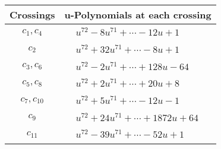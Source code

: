 \documentclass[1p]{elsarticle_modified}
\theoremstyle{definition}
\begin{document}
\begin{tabular}{m{50pt}|m{274pt}}
Crossings & \hspace{64pt}u-Polynomials at each crossing \\
\hline $$\begin{aligned}c_{1},c_{4}\end{aligned}$$&$\begin{aligned}
&u^{72}-8 u^{71}+\cdots-12 u+1
\end{aligned}$\\
\hline $$\begin{aligned}c_{2}\end{aligned}$$&$\begin{aligned}
&u^{72}+32 u^{71}+\cdots-8 u+1
\end{aligned}$\\
\hline $$\begin{aligned}c_{3},c_{6}\end{aligned}$$&$\begin{aligned}
&u^{72}-2 u^{71}+\cdots+128 u-64
\end{aligned}$\\
\hline $$\begin{aligned}c_{5},c_{8}\end{aligned}$$&$\begin{aligned}
&u^{72}+2 u^{71}+\cdots+20 u+8
\end{aligned}$\\
\hline $$\begin{aligned}c_{7},c_{10}\end{aligned}$$&$\begin{aligned}
&u^{72}+5 u^{71}+\cdots-12 u-1
\end{aligned}$\\
\hline $$\begin{aligned}c_{9}\end{aligned}$$&$\begin{aligned}
&u^{72}+24 u^{71}+\cdots+1872 u+64
\end{aligned}$\\
\hline $$\begin{aligned}c_{11}\end{aligned}$$&$\begin{aligned}
&u^{72}-39 u^{71}+\cdots-52 u+1
\end{aligned}$\\
\hline
\end{tabular}\\~\\
\newpage\renewcommand{\arraystretch}{1}
\end{document}
